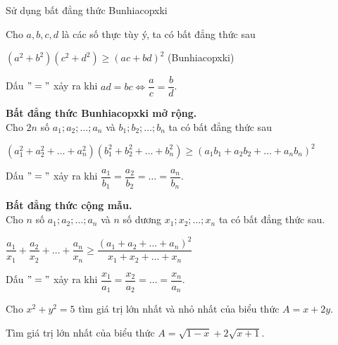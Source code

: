 \begin{dang}{Sử dụng bất đẳng thức Bunhiacopxki}
\begin{dl}
	Cho $a,b,c,d $ là các số thực tùy ý, ta có bất đẳng thức sau
	\begin{center}
		$(a^2+b^2)(c^2+d^2)\geq (ac+bd)^2 $ (Bunhiacopxki)
	\end{center}
	Dấu $"="$ xảy ra khi $ ad=bc\Leftrightarrow\dfrac{a}{c}=\dfrac{b}{d}$.
\end{dl}
\begin{hq}
	\textbf{Bất đẳng thức Bunhiacopxki mở rộng.}\\
	Cho $2n$ số $a_1;a_2;\ldots;a_n$ và $b_1;b_2;\ldots;b_n$ ta có bất đẳng thức sau
	\begin{center}
		$(a_1^2+a_2^2+\ldots+a_n^2)(b_1^2+b_2^2+\ldots+b_n^2)\geq (a_1b_1+a_2b_2+\ldots+a_nb_n)^2  $
	\end{center}
	Dấu $"="$ xảy ra khi $\dfrac{a_1}{b_1}=\dfrac{a_2}{b_2}=\ldots=\dfrac{a_n}{b_n}$.
\end{hq}
\begin{hq}
	\textbf{Bất đẳng thức cộng mẫu.}\\
	Cho $n$ số $a_1;a_2;\ldots;a_n$ và $n$ số dương $x_1;x_2;\ldots;x_n$ ta có bất đẳng thức sau.
	\begin{center}
		$\dfrac{a_1}{x_1}+\dfrac{a_2}{x_2}+\ldots+\dfrac{a_n}{x_n}\geq \dfrac{(a_1+a_2+\ldots+a_n)^2}{x_1+x_2+\ldots+x_n}$
	\end{center}
	Dấu $"="$ xảy ra khi $\dfrac{x_1}{a_1}=\dfrac{x_2}{a_2}=\ldots=\dfrac{x_n}{a_n}$.
\end{hq}
\end{dang}
\setcounter{vd}{0}
\begin{vd}%
	Cho $x^2+y^2=5$ tìm giá trị lớn nhất và nhỏ nhất của biểu thức $A=x+2y$.
\end{vd}
\begin{vd}%
	Tìm giá trị lớn nhất của biểu thức $A=\sqrt{1-x}+2\sqrt{x+1}$.
\end{vd}
